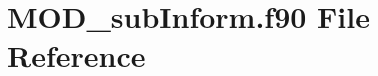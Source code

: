 \hypertarget{MOD__subInform_8f90}{\section{M\-O\-D\-\_\-sub\-Inform.\-f90 File Reference}
\label{MOD__subInform_8f90}
}
